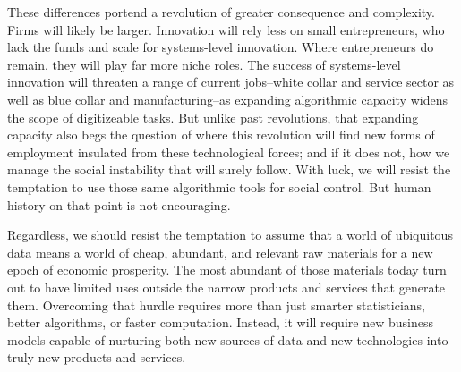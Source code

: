 \documentclass[12pt]{article}
\begin{document}
These differences portend a revolution of greater consequence and
complexity. Firms will likely be larger. Innovation will rely less on
small entrepreneurs, who lack the funds and scale for systems-level
innovation. Where entrepreneurs do remain, they will play far more
niche roles. The success of systems-level innovation will threaten a
range of current jobs--white collar and service sector as well as blue
collar and manufacturing--as expanding algorithmic capacity widens the
scope of digitizeable tasks. But unlike past revolutions, that
expanding capacity also begs the question of where this revolution
will find new forms of employment insulated from these technological
forces; and if it does not, how we manage the social instability that
will surely follow. With luck, we will resist the temptation to use
those same algorithmic tools for social control. But human history on
that point is not encouraging.

Regardless, we should resist the temptation to assume that a world of
ubiquitous data means a world of cheap, abundant, and relevant raw
materials for a new epoch of economic prosperity. The most abundant of
those materials today turn out to have limited uses outside the narrow
products and services that generate them. Overcoming that hurdle
requires more than just smarter statisticians, better algorithms, or
faster computation. Instead, it will require new business models
capable of nurturing both new sources of data and new technologies
into truly new products and services. 










\end{document}
